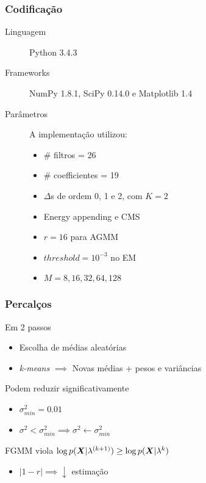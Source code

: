 \begin{frame}
\frametitle{Codificação}
\begin{description}
    \item[Linguagem] Python 3.4.3
    \pause
    \item[Frameworks] NumPy 1.8.1, SciPy 0.14.0 e Matplotlib 1.4
    \pause
    \item[Parâmetros] A implementação utilizou:
    \pause
    \begin{itemize}
        \item \# filtros = 26
        \item \# coefficientes = 19
        \item $\Delta$s de ordem 0, 1 e 2, com $K = 2$
        \item Energy appending e CMS
        \item $r = 16$ para AGMM
        \item $threshold = 10^{-3}$ no EM
        \item $M = 8, 16, 32, 64, 128$
    \end{itemize}
\end{description}
\end{frame}

\begin{frame}
\frametitle{Percalços}
\begin{description}\itemsep6pt
    \item[Inicialização] Em 2 passos
    \pause
    \begin{itemize}
        \item Escolha de médias aleatórias
        \item \emph{k-means} $\implies$ Novas médias + pesos e variâncias
        \pause
    \end{itemize}
    \item[Variâncias] Podem reduzir significativamente
    \pause
    \begin{itemize}\itemsep4pt
        \item $\sigma_{min}^2 = 0.01$
        \item $\sigma^2 < \sigma_{min}^2 \implies \sigma^2 \gets \sigma_{min}^2$
        \pause
    \end{itemize}
    \item[$\overline{Monotonic}$] FGMM viola $\log p(\boldsymbol{X}|\lambda^{(k+1)}) \geq \log p(\boldsymbol{X}|\lambda^{k})$
    \pause
    \begin{itemize}\itemsep4pt
        \item $|1 - r| \implies \downarrow$ estimação
    \end{itemize}
\end{description}
\end{frame}

